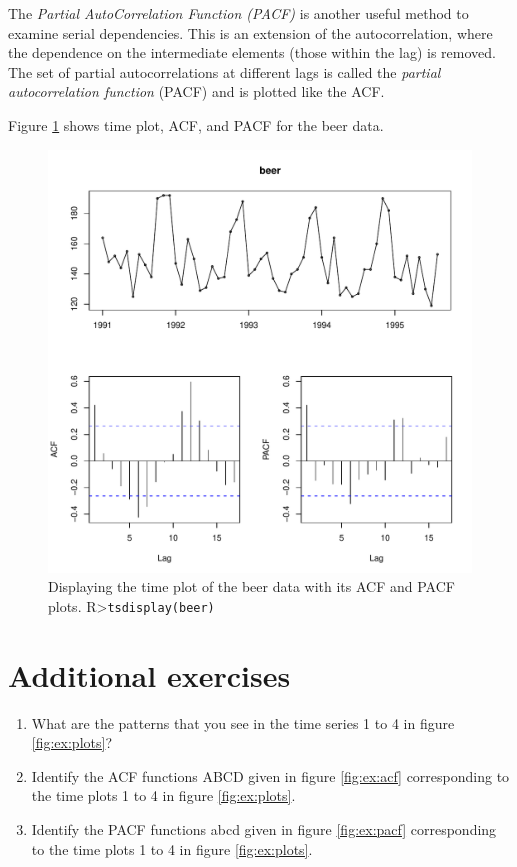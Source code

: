 \documentclass[a4paper,11pt,oneside,onecolumn]{book}
\begin{document}
\begin{definition}
The {\it Partial AutoCorrelation Function (PACF)} is another useful method to examine serial dependencies. This is an extension of the autocorrelation, where the dependence on the intermediate elements (those within  the lag) is removed. 
The set of partial autocorrelations at different lags is called the
{\it partial autocorrelation function} (PACF) and is plotted like
the ACF. 
\label{def:PACF}
\end{definition}


Figure \ref{fig:tsdisplay:beer} shows time plot, ACF, and PACF for the beer data. 

\begin{figure}[!h]
\begin{center}
\includegraphics[width=.8\linewidth]{ tsdisplaybeer}
\end{center}
\caption{Displaying the time plot of the beer data with its ACF and PACF plots. R>\texttt{tsdisplay(beer)}}
\label{fig:tsdisplay:beer}
\end{figure}





\section{Additional exercises}


\begin{enumerate}
\item What are the patterns that you see in the time series 1 to 4 in figure \ref{fig:ex:plots}?
\item Identify the ACF functions ABCD given in figure \ref{fig:ex:acf} corresponding to the time plots 1 to 4 in figure \ref{fig:ex:plots}. 
\item Identify the PACF functions  abcd given in figure \ref{fig:ex:pacf} corresponding to the time plots 1 to 4 in figure \ref{fig:ex:plots}. 

\end{enumerate}
\end{document}
